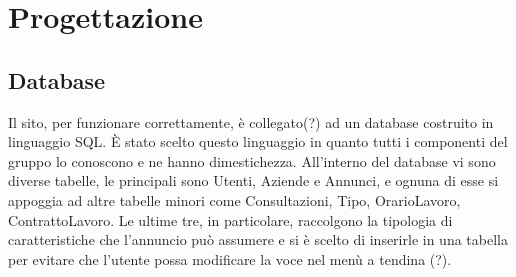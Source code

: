 \section{Progettazione}
	\subsection{Database}
Il sito, per funzionare correttamente, è collegato(?) ad un database costruito in linguaggio SQL. È stato scelto questo linguaggio in quanto tutti i componenti del gruppo lo conoscono e ne hanno dimestichezza. 
All'interno del database vi sono diverse tabelle, le principali sono Utenti, Aziende e Annunci, e ognuna di esse si appoggia ad altre tabelle minori come Consultazioni, Tipo, OrarioLavoro, ContrattoLavoro. Le ultime tre, in particolare, raccolgono la tipologia di caratteristiche che l'annuncio può assumere e si è scelto di inserirle in una tabella per evitare che l'utente possa modificare la voce nel menù a tendina (?).   


